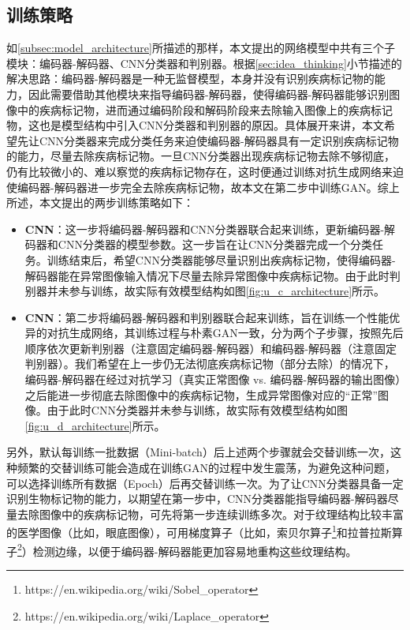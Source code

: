 \subsection{训练策略}\label{subsec:traing_stragies}
如\ref{subsec:model_architecture}所描述的那样，本文提出的网络模型中共有三个子模块：编码器-解码器、CNN分类器和判别器。根据\ref{sec:idea_thinking}小节描述的解决思路：编码器-解码器是一种无监督模型，本身并没有识别疾病标记物的能力，因此需要借助其他模块来指导编码器-解码器，使得编码器-解码器能够识别图像中的疾病标记物，进而通过编码阶段和解码阶段来去除输入图像上的疾病标记物，这也是模型结构中引入CNN分类器和判别器的原因。具体展开来讲，本文希望先让CNN分类器来完成分类任务来迫使编码器-解码器具有一定识别疾病标记物的能力，尽量去除疾病标记物。一旦CNN分类器出现疾病标记物去除不够彻底，仍有比较微小的、难以察觉的疾病标记物存在，这时便通过训练对抗生成网络来迫使编码器-解码器进一步完全去除疾病标记物，故本文在第二步中训练GAN。综上所述，本文提出的两步训练策略如下：
\begin{itemize}\label{item:training_steps}
	\item 
	\textbf{CNN}：这一步将编码器-解码器和CNN分类器联合起来训练，更新编码器-解码器和CNN分类器的模型参数。这一步旨在让CNN分类器完成一个分类任务。训练结束后，希望CNN分类器能够尽量识别出疾病标记物，使得编码器-解码器能在异常图像输入情况下尽量去除异常图像中疾病标记物。由于此时判别器并未参与训练，故实际有效模型结构如图\ref{fig:u_c_architecture}所示。
	\item {}\textbf{CNN}：第二步将编码器-解码器和判别器联合起来训练，旨在训练一个性能优异的对抗生成网络，其训练过程与朴素GAN一致，分为两个子步骤，按照先后顺序依次更新判别器（注意固定编码器-解码器）和编码器-解码器（注意固定判别器）。我们希望在上一步仍无法彻底疾病标记物（部分去除）的情况下，编码器-解码器在经过对抗学习（真实正常图像 vs. 编码器-解码器的输出图像）之后能进一步彻底去除图像中的疾病标记物，生成异常图像对应的“正常”图像。由于此时CNN分类器并未参与训练，故实际有效模型结构如图\ref{fig:u_d_architecture}所示。
\end{itemize}
另外，默认每训练一批数据（Mini-batch）后上述两个步骤就会交替训练一次，这种频繁的交替训练可能会造成在训练GAN的过程中发生震荡，为避免这种问题，可以选择训练所有数据（Epoch）后再交替训练一次。为了让CNN分类器具备一定识别生物标记物的能力，以期望在第一步中，CNN分类器能指导编码器-解码器尽量去除图像中的疾病标记物，可先将第一步连续训练多次。对于纹理结构比较丰富的医学图像（比如，眼底图像），可用梯度算子（比如，索贝尔算子\footnote{https://en.wikipedia.org/wiki/Sobel\_operator}和拉普拉斯算子\footnote{https://en.wikipedia.org/wiki/Laplace\_operator}）检测边缘，以便于编码器-解码器能更加容易地重构这些纹理结构。

